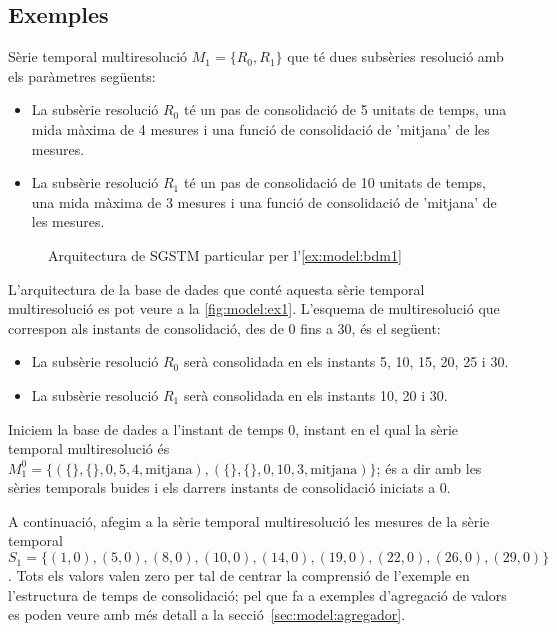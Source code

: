 \subsection{Exemples}

\begin{example} 
\label{ex:model:bdm1}%


Sèrie temporal multiresolució $M_1=\{R_0,R_1\}$ que té dues subsèries
resolució amb els paràmetres següents:
\begin{itemize}
\item La subsèrie resolució $R_0$ té un pas de consolidació de 5
  unitats de temps, una mida màxima de 4 mesures i una funció de
  consolidació de 'mitjana' de les mesures.
\item La subsèrie resolució $R_1$ té un pas de consolidació de 10
  unitats de temps, una mida màxima de 3 mesures i una funció de
  consolidació de 'mitjana' de les mesures.
\end{itemize}

\begin{figure}[tp]
\centering

\caption{Arquitectura de SGSTM particular per l'\autoref{ex:model:bdm1}}
\label{fig:model:ex1}
\end{figure}

L'arquitectura de la base de dades que conté aquesta sèrie temporal
multiresolució es pot veure a la \autoref{fig:model:ex1}. 
 L'esquema
de multiresolució que correspon als instants de consolidació, des de 0
fins a 30, és el següent:
\begin{itemize}
\item La subsèrie resolució $R_0$ serà consolidada en els instants 5,
  10, 15, 20, 25 i 30.
\item La subsèrie resolució $R_1$ serà consolidada en els instants 10,
  20 i 30.
\end{itemize}


Iniciem la base de dades a l'instant de temps 0, instant en el qual la
sèrie temporal multiresolució és $M_1^0 = \{ ( \{\} , \{\} , 0 , 5 ,4
, \text{mitjana} ) , ( \{\} , \{\} , 0 , 10 ,3 , \text{mitjana} ) \}$;
és a dir amb les sèries temporals buides i els darrers instants de
consolidació iniciats a 0.




A continuació, afegim a la sèrie temporal multiresolució les mesures
de la sèrie temporal $S_1=\{
(1,0),(5,0),(8,0),(10,0),(14,0),(19,0),(22,0),(26,0),(29,0) \}$. Tots
els valors valen zero per tal de centrar la comprensió de l'exemple en
l'estructura de temps de consolidació; pel que fa a exemples
d'agregació de valors es poden veure amb més detall a la
secció~\ref{sec:model:agregador}.



\end{example}

